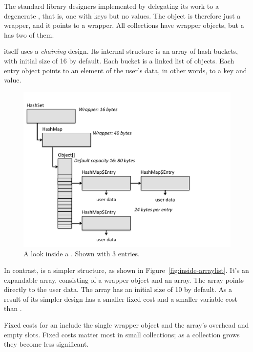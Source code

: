 The standard library designers implemented
 by delegating its work to a degenerate ,
that is, one with keys but no values.
The  object is therefore just a wrapper, and it points to a
 wrapper. All collections have
wrapper objects, but a  has two of them. 

 itself uses a \emph{chaining}
design. Its internal structure is an array of hash buckets, with initial size of
16 by default.  Each bucket is a linked
list of  objects. Each entry object points to an element of the user's data, in other
words, to a key and value.

 \begin{figure}
  \centering
 \includegraphics[width=.80\textwidth]{part1/Figures/collections/inside-hashset.pdf}
  \caption{A look inside a . Shown with 3
  entries.}
  \label{fig:inside-hashset}
\end{figure}

In contrast,  is a simpler structure, as shown in
Figure~\ref{fig:inside-arraylist}. It's an expandable array,
consisting of a wrapper object and an array.  The array points directly to the
user data. The array has an initial size of 10 by default.  As a result of its
simpler design  has a smaller fixed cost and a smaller
variable cost than .

Fixed costs for an  include the single wrapper object and the
array's \jre overhead and empty slots. Fixed costs
matter most in small collections; as a collection grows they become less significant. 

